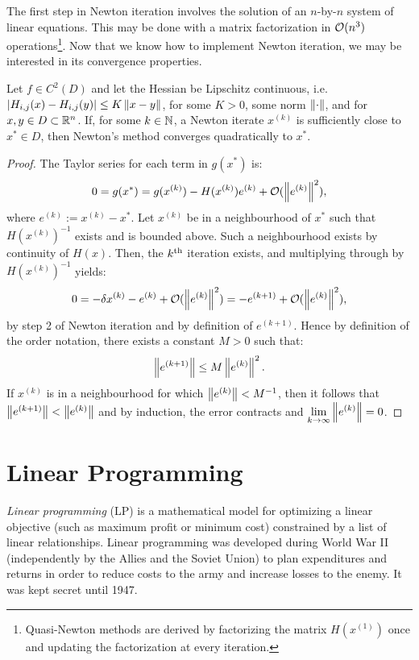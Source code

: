 The first step in Newton iteration involves the solution of an $n$-by-$n$ system of linear equations. This may be done with a matrix factorization in $\mathcal{O}(n^3)$ operations\footnote{Quasi-Newton methods are derived by factorizing the matrix $H(x^{(1)})$ once and updating the factorization at every iteration.}. Now that we know how to implement Newton iteration, we may be interested in its convergence properties.

\begin{theorem}
Let $f\in C^2(D)$ and let the Hessian be Lipschitz continuous, i.e. $\left|{H_{i,j}(x) - H_{i,j}(y)}\right| \le K\left\|{x-y}\right\|$, for some $K>0$, some norm $\left\|{\cdot}\right\|$, and for $x,y\in D\subset\mathbb{R}^n$. If, for some $k\in\mathbb{N}$, a Newton iterate $x^{(k)}$ is sufficiently close to $x^*\in D$, then Newton's method converges quadratically to $x^*$.
\end{theorem}
\begin{proof}
The Taylor series for each term in $g(x^*)$ is:
\[
0 = g(x^*) = g(x^{(k)}) - H(x^{(k)})e^{(k)} + \mathcal{O}(\left\|{e^{(k)}}\right\|^2),
\]
where $e^{(k)} := x^{(k)} - x^*$. Let $x^{(k)}$ be in a neighbourhood of $x^*$ such that $H(x^{(k)})^{-1}$ exists and is bounded above. Such a neighbourhood exists by continuity of $H(x)$. Then, the $k^{\rm th}$ iteration exists, and multiplying through by $H(x^{(k)})^{-1}$ yields:
\[
0 = -\delta x^{(k)} - e^{(k)} + \mathcal{O}(\left\|{e^{(k)}}\right\|^2) = -e^{(k+1)} + \mathcal{O}(\left\|{e^{(k)}}\right\|^2),
\]
by step 2 of Newton iteration and by definition of $e^{(k+1)}$. Hence by definition of the order notation, there exists a constant $M>0$ such that:
\[
\left\|{e^{(k+1)}}\right\| \le M\left\|{e^{(k)}}\right\|^2.
\]
If $x^{(k)}$ is in a neighbourhood for which $\left\|{e^{(k)}}\right\| < M^{-1}$, then it follows that $\left\|{e^{(k+1)}}\right\| < \left\|{e^{(k)}}\right\|$ and by induction, the error contracts and $\displaystyle\lim_{k\to\infty}\left\|{e^{(k)}}\right\|=0$.
\end{proof}

\section{Linear Programming}

{\em Linear programming} (LP) is a mathematical model for optimizing a linear objective (such as maximum profit or minimum cost) constrained by a list of linear relationships. Linear programming was developed during World War II (independently by the Allies and the Soviet Union) to plan expenditures and returns in order to reduce costs to the army and increase losses to the enemy. It was kept secret until 1947.

